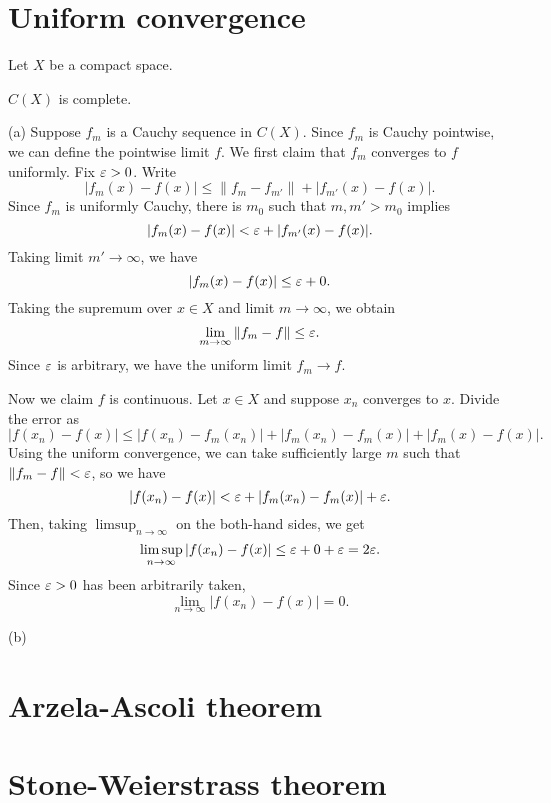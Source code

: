 \documentclass{../../large}
\begin{document}
\section{Uniform convergence}

\begin{prb}
Let $X$ be a compact space.
\begin{parts}
\item $C(X)$ is complete.
\end{parts}
\end{prb}
\begin{pf}
(a)
Suppose $f_m$ is a Cauchy sequence in $C(X)$.
Since $f_m$ is Cauchy pointwise, we can define the pointwise limit $f$.
We first claim that $f_m$ converges to $f$ uniformly.
Fix $\varepsilon>0$.
Write
\[|f_m(x)-f(x)|\le\|f_m-f_{m'}\|+|f_{m'}(x)-f(x)|.\]
Since $f_m$ is uniformly Cauchy, there is $m_0$ such that $m,m'>m_0$ implies
\[|f_m(x)-f(x)|<\varepsilon+|f_{m'}(x)-f(x)|.\]
Taking limit $m'\to\infty$, we have
\[|f_m(x)-f(x)|\le\varepsilon+0.\]
Taking the supremum over $x\in X$ and limit $m\to\infty$, we obtain
\[\lim_{m\to\infty}\|f_m-f\|\le\varepsilon.\]
Since $\varepsilon$ is arbitrary, we have the uniform limit $f_m\to f$.

Now we claim $f$ is continuous.
Let $x\in X$ and suppose $x_n$ converges to $x$.
Divide the error as
\[|f(x_n)-f(x)|\le|f(x_n)-f_m(x_n)|+|f_m(x_n)-f_m(x)|+|f_m(x)-f(x)|.\]
Using the uniform convergence, we can take sufficiently large $m$ such that $\|f_m-f\|<\varepsilon$, so we have
\[|f(x_n)-f(x)|<\varepsilon+|f_m(x_n)-f_m(x)|+\varepsilon.\]
Then, taking $\limsup_{n\to\infty}$ on the both-hand sides, we get
\[\limsup_{n\to\infty}|f(x_n)-f(x)|\le\varepsilon+0+\varepsilon=2\varepsilon.\]
Since $\varepsilon>0$ has been arbitrarily taken,
\[\lim_{n\to\infty}|f(x_n)-f(x)|=0.\]

(b)

\end{pf}

\section{Arzela-Ascoli theorem}

\section{Stone-Weierstrass theorem}
\end{document}

